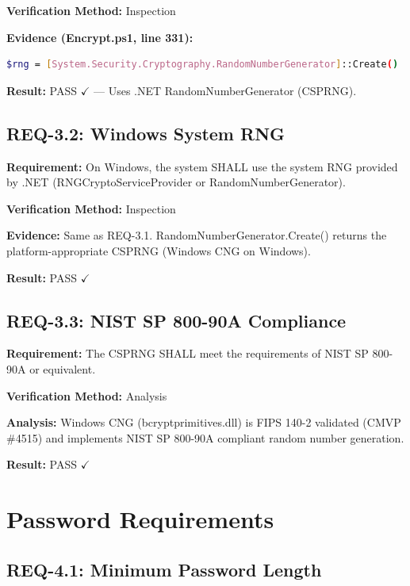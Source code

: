 \documentclass[11pt,letterpaper]{article}
\begin{document}
\textbf{Verification Method:} Inspection

\begin{samepage}
\textbf{Evidence (Encrypt.ps1, line 331):}
\begin{lstlisting}[language=bash]
$rng = [System.Security.Cryptography.RandomNumberGenerator]::Create()
\end{lstlisting}
\textbf{Result:} PASS $\checkmark$ --- Uses .NET RandomNumberGenerator (CSPRNG).
\end{samepage}

\subsection{REQ-3.2: Windows System RNG}

\textbf{Requirement:} On Windows, the system SHALL use the system RNG provided by .NET (RNGCryptoServiceProvider or RandomNumberGenerator).

\textbf{Verification Method:} Inspection

\textbf{Evidence:} Same as REQ-3.1. RandomNumberGenerator.Create() returns the platform-appropriate CSPRNG (Windows CNG on Windows).

\textbf{Result:} PASS $\checkmark$

\subsection{REQ-3.3: NIST SP 800-90A Compliance}

\textbf{Requirement:} The CSPRNG SHALL meet the requirements of NIST SP 800-90A or equivalent.

\textbf{Verification Method:} Analysis

\textbf{Analysis:} Windows CNG (bcryptprimitives.dll) is FIPS 140-2 validated (CMVP \#4515) and implements NIST SP 800-90A compliant random number generation.

\textbf{Result:} PASS $\checkmark$

\newpage
\section{Password Requirements}

\subsection{REQ-4.1: Minimum Password Length}
\end{document}
